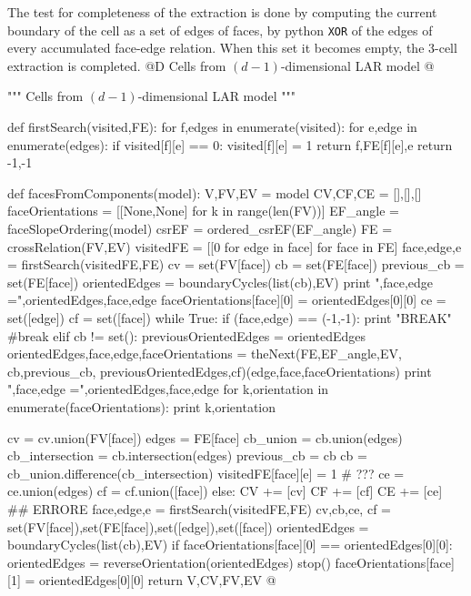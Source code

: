 \documentclass[11pt,oneside]{article}    %
\begin{document}
The test for completeness of the extraction is done by computing the current boundary of the cell as a set of edges of faces, by python \texttt{XOR} of the edges of every accumulated face-edge relation. When this set it becomes empty, the 3-cell extraction is completed.
@D Cells from $(d-1)$-dimensional LAR model
@{""" Cells from $(d-1)$-dimensional LAR model """

def firstSearch(visited,FE):
    for f,edges in enumerate(visited):
        for e,edge in enumerate(edges):
            if visited[f][e] == 0:
                visited[f][e] = 1
                return f,FE[f][e],e
    return -1,-1

def facesFromComponents(model):
    V,FV,EV = model
    CV,CF,CE = [],[],[]
    faceOrientations = [[None,None] for k in range(len(FV))]
    EF_angle = faceSlopeOrdering(model)
    csrEF = ordered_csrEF(EF_angle)
    FE = crossRelation(FV,EV)
    visitedFE = [[0 for edge in face] for face in FE]
    face,edge,e = firstSearch(visitedFE,FE)
    cv = set(FV[face])
    cb = set(FE[face])
    previous_cb = set(FE[face])
    orientedEdges = boundaryCycles(list(cb),EV)
    print "\norientedEdges,face,edge =",orientedEdges,face,edge
    faceOrientations[face][0] = orientedEdges[0][0]
    ce = set([edge])
    cf = set([face])
    while True:
        if (face,edge) == (-1,-1):
            print "BREAK"
            #break
        elif cb != set():  
            previousOrientedEdges = orientedEdges
            orientedEdges,face,edge,faceOrientations = theNext(FE,EF_angle,EV, cb,previous_cb, previousOrientedEdges,cf)(edge,face,faceOrientations)
            print "\norientedEdges,face,edge =",orientedEdges,face,edge
            for k,orientation in enumerate(faceOrientations):
                print k,orientation

            cv = cv.union(FV[face])
            edges = FE[face]
            cb_union = cb.union(edges)
            cb_intersection = cb.intersection(edges)
            previous_cb = cb
            cb = cb_union.difference(cb_intersection) 
            visitedFE[face][e] = 1  # ???
            ce = ce.union(edges)
            cf = cf.union([face])
        else:
            CV += [cv]
            CF += [cf]
            CE += [ce] ## ERRORE
            face,edge,e = firstSearch(visitedFE,FE)
            cv,cb,ce, cf = set(FV[face]),set(FE[face]),set([edge]),set([face])
            orientedEdges = boundaryCycles(list(cb),EV)
            if faceOrientations[face][0] == orientedEdges[0][0]:
                orientedEdges = reverseOrientation(orientedEdges)
                stop()
            faceOrientations[face][1] = orientedEdges[0][0]
    return V,CV,FV,EV
@}
\end{document}

